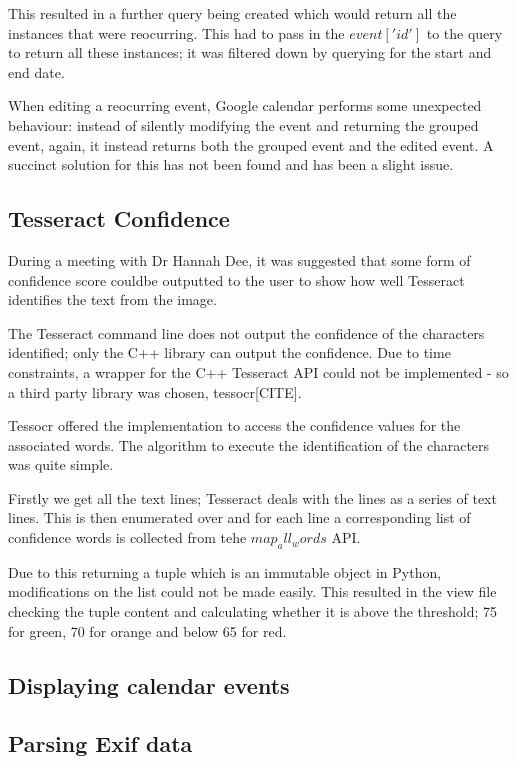 This resulted in a further query being created which would return all the instances that were reocurring. This had to pass in the $event['id']$ to the query to return all these instances; it was filtered down by querying for the start and end date.

When editing a reocurring event, Google calendar performs some unexpected behaviour: instead of silently modifying the event and returning the grouped event, again, it instead returns both the grouped event and the edited event. A succinct solution for this has not been found and has been a slight issue.

\subsection{Tesseract Confidence}
During a meeting with Dr Hannah Dee, it was suggested that some form of confidence score couldbe outputted to the user to show how well Tesseract identifies the text from the image.

The Tesseract command line does not output the confidence of the characters identified; only the C++ library can output the confidence. Due to time constraints, a wrapper for the C++ Tesseract API could not be implemented - so a third party library was chosen, tessocr[CITE].

Tessocr offered the implementation to access the confidence values for the associated words. The algorithm to execute the identification of the characters was quite simple.

Firstly we get all the text lines; Tesseract deals with the lines as a series of text lines. This is then enumerated over and for each line a corresponding list of confidence words is collected from tehe $map_all_words$ API.

Due to this returning a tuple which is an immutable object in Python, modifications on the list could not be made easily. This resulted in the view file checking the tuple content and calculating whether it is above the threshold; 75 for green, 70 for orange and below 65 for red.

\subsection{Displaying calendar events}

\subsection{Parsing Exif data}

